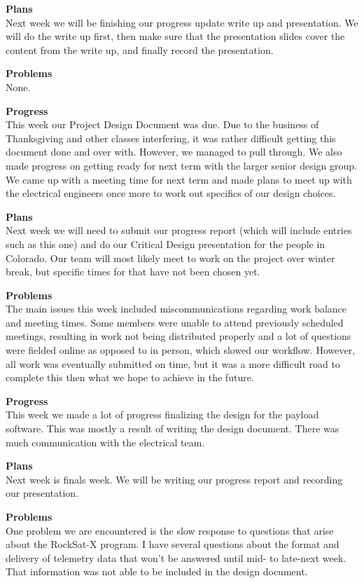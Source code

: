 \textbf{Plans} \\ 
Next week we will be finishing our progress update write up and presentation. We will do the write up first, then make sure that the presentation slides cover the content from the write up, and finally record the presentation.

\textbf{Problems} \\ 
None.

\textbf{Progress} \\ 
This week our Project Design Document was due. Due to the business of Thanksgiving and other classes interfering, 
it was rather difficult getting this document done and over with. However, we managed to pull through. We also
made progress on getting ready for next term with the larger senior design group. We came up with a meeting time
for next term and made plans to meet up with the electrical engineers once more to work out specifics
of our design choices.

\textbf{Plans} \\ 
Next week we will need to submit our progress report (which will include entries such as this one) and do
our Critical Design presentation for the people in Colorado. Our team will most likely meet to work on the
project over winter break, but specific times for that have not been chosen yet.

\textbf{Problems} \\ 
The main issues this week included miscommunications regarding work balance and meeting times. Some
members were unable to attend previously scheduled meetings, resulting in work not being distributed
properly and a lot of questions were fielded online as opposed to in person, which slowed our workflow.
However, all work was eventually submitted on time, but it was a more difficult road to complete this then
what we hope to achieve in the future.

\textbf{Progress} \\
This week we made a lot of progress finalizing the design for the \gls{payload} software. This was mostly a result of writing the design document. There was much communication with the electrical team.

\textbf{Plans} \\
Next week is finals week. We will be writing our progress report and recording our presentation.

\textbf{Problems} \\
One problem we are encountered is the slow response to questions that arise about the RockSat-X program. I have several questions about the format and delivery of telemetry data that won't be answered until mid- to late-next week. That information was not able to be included in the design document.
